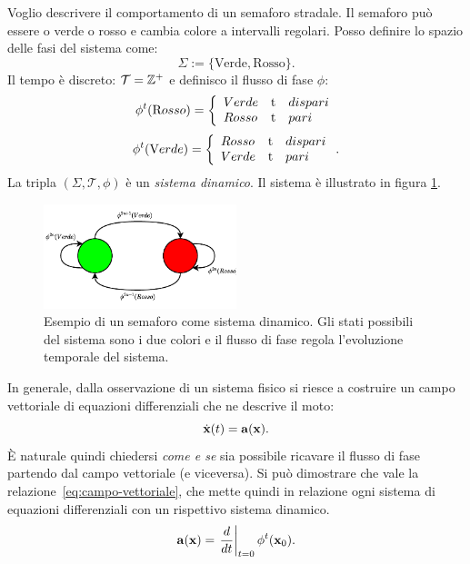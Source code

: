 \begin{example}
    \label{ex:semaforo}
    Voglio descrivere il comportamento di un semaforo stradale.
    Il semaforo può essere o verde o rosso e cambia colore a intervalli regolari.
    Posso definire lo spazio delle fasi del sistema come:
    \begin{equation*}
        \Sigma := \{\text{Verde}, \text{Rosso} \}.
    \end{equation*}
    Il tempo è discreto: $\mathcal T = \mathbb{Z}^+$ e definisco il flusso di fase $\phi$:
    \begin{equation*}
        \phi^t(\text Rosso) = \left\{
        \begin{array}{lrl}
            Verde &$t$ &dispari\\
            Rosso &$t$ &pari
        \end{array}
        \right.
    \end{equation*}
    \begin{equation*}
        \phi^t(\text Verde) = \left\{
        \begin{array}{lrl}
            Rosso &$t$ &dispari\\
            Verde &$t$ &pari
        \end{array}
        \right.
        .
    \end{equation*}
    La tripla $(\Sigma, \mathcal T, \phi)$ è un \emph{sistema dinamico}.
    Il sistema è illustrato in figura \ref{fig:esempio-semaforo}.
    \begin{figure}[H]
        \centering
        \includegraphics[width=0.5\textwidth]{assets/ex-semaforo}
        \caption[Semaforo]{Esempio di un semaforo come sistema dinamico.
        Gli stati possibili del sistema sono i due colori e il flusso di fase
        regola l'evoluzione temporale del sistema.}
        \label{fig:esempio-semaforo}
    \end{figure}
\end{example}


In generale, dalla osservazione di un sistema fisico si riesce a costruire un campo vettoriale
di equazioni differenziali che ne descrive il moto:
\begin{equation*}
    \dot {\mathbf{x}} (t) = \mathbf{a}(\mathbf{x}).
\end{equation*}
È naturale quindi chiedersi \emph{come e se} sia possibile ricavare il flusso di fase partendo
dal campo vettoriale (e viceversa).
Si può dimostrare  che vale la relazione~\eqref{eq:campo-vettoriale},
che mette quindi in relazione ogni sistema di equazioni differenziali con un rispettivo sistema dinamico.
\begin{equation}
    \mathbf{a} (\mathbf{x}) = \left.\frac d {dt} \right| _{t=0} \phi^t (\mathbf{x}_0).
    \label{eq:campo-vettoriale}
\end{equation}


